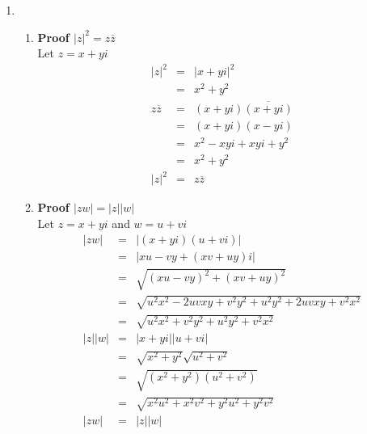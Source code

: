 \documentclass{article}%
\newcommand\abs[1]{\left|#1\right|}
\newenvironment{proof}[1][]{\begin{samepage}\textbf{Proof #1} }{\end{samepage}}
\begin{document}
\begin{enumerate}
\begin{enumerate}[label*=\arabic*.]
\begin{enumerate}[label=\alph*]
        \end{enumerate}
        \item
        \begin{enumerate}[label=\alph*]
            \item
            \begin{proof}[$\abs{z}^2=z\overline{z}$]
                \\ Let $z=x+yi$
                \begin{eqnarray*}
                    \abs{z}^2&=&\abs{x+yi}^2 \\
                             &=&x^2+y^2 \\
                    z\overline{z}&=&(x+yi)\overline{(x+yi)} \\
                                 &=&(x+yi)(x-yi) \\
                                 &=&x^2-xyi+xyi+y^2 \\
                                 &=&x^2+y^2 \\
                    \abs{z}^2&=&z\overline{z}
                \end{eqnarray*}
            \end{proof}
            \item
            \begin{proof}[$\abs{zw}=\abs{z}\abs{w}$]
                \\ Let $z=x+yi$ and $w=u+vi$
                \begin{eqnarray*}
                    \abs{zw}&=&\abs{(x+yi)(u+vi)} \\
                            &=&\abs{xu-vy+(xv+uy)i} \\
                            &=&\sqrt{(xu-vy)^2+(xv+uy)^2} \\
                            &=&\sqrt{u^2x^2-2uvxy+v^2y^2+u^2y^2+2uvxy+v^2x^2} \\
                            &=&\sqrt{u^2x^2+v^2y^2+u^2y^2+v^2x^2} \\
                    \abs{z}\abs{w}&=&\abs{x+yi}\abs{u+vi} \\
                                  &=&\sqrt{x^2+y^2}\sqrt{u^2+v^2} \\
                                  &=&\sqrt{(x^2+y^2)(u^2+v^2)} \\
                                  &=&\sqrt{x^2u^2+x^2v^2+y^2u^2+y^2v^2} \\
                    \abs{zw}&=&\abs{z}\abs{w}
                \end{eqnarray*}

\end{proof}
\end{enumerate}
\end{enumerate}
\end{enumerate}
\end{document}
